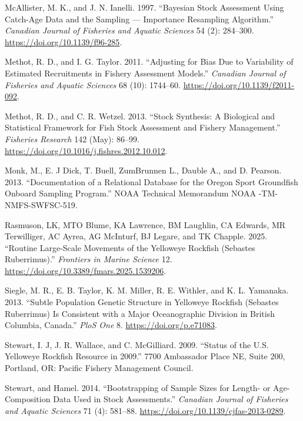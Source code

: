 \documentclass[
]{scrartcl}
\newlength{\cslhangindent}
\newenvironment{CSLReferences}[2] %
 {\begin{list}{}{%
  \setlength{\itemindent}{0pt}
  \setlength{\leftmargin}{0pt}
  \setlength{\parsep}{0pt}
  \ifodd #1
   \setlength{\leftmargin}{\cslhangindent}
   \setlength{\itemindent}{-1\cslhangindent}
  \fi
  \setlength{\itemsep}{#2\baselineskip}}}
 {\end{list}}
\begin{document}
\begin{CSLReferences}{1}{0}
McAllister, M. K., and J. N. Ianelli. 1997. {``Bayesian Stock Assessment
Using Catch-Age Data and the Sampling --- Importance Resampling
Algorithm.''} \emph{Canadian Journal of Fisheries and Aquatic Sciences}
54 (2): 284--300. \url{https://doi.org/10.1139/f96-285}.

Methot, R. D., and I. G. Taylor. 2011. {``Adjusting for Bias Due to
Variability of Estimated Recruitments in Fishery Assessment Models.''}
\emph{Canadian Journal of Fisheries and Aquatic Sciences} 68 (10):
1744--60. \url{https://doi.org/10.1139/f2011-092}.

Methot, R. D., and C. R. Wetzel. 2013. {``Stock Synthesis: A Biological
and Statistical Framework for Fish Stock Assessment and Fishery
Management.''} \emph{Fisheries Research} 142 (May): 86--99.
\url{https://doi.org/10.1016/j.fishres.2012.10.012}.

Monk, M., E. J Dick, T. Buell, ZumBrunnen L., Dauble A., and D. Pearson.
2013. {``Documentation of a Relational Database for the Oregon Sport
Groundfish Onboard Sampling Program.''} NOAA Technical Memorandum NOAA
-TM-NMFS-SWFSC-519.

Rasmuson, LK, MTO Blume, KA Lawrence, BM Laughlin, CA Edwards, MR
Terwilliger, AC Ayrea, AG McInturf, BJ Legare, and TK Chapple. 2025.
{``Routine Large-Scale Movements of the Yelloweye Rockfish (Sebastes
Ruberrimus).''} \emph{Frontiers in Marine Science} 12.
\url{https://doi.org/10.3389/fmars.2025.1539206}.

Siegle, M. R., E. B. Taylor, K. M. Miller, R. E. Withler, and K. L.
Yamanaka. 2013. {``Subtle Population Genetic Structure in Yelloweye
Rockfish (Sebastes Ruberrimus) Is Consistent with a Major Oceanographic
Division in British Columbia, Canada.''} \emph{PloS One} 8.
\url{https://doi.org/p.e71083}.

Stewart, I. J, J. R. Wallace, and C. McGilliard. 2009. {``Status of the
{U}.{S}. Yelloweye Rockfish Resource in 2009.''} 7700 Ambassador Place
NE, Suite 200, Portland, OR: Pacific Fishery Management Council.

Stewart, and Hamel. 2014. {``Bootstrapping of Sample Sizes for Length-
or Age-Composition Data Used in Stock Assessments.''} \emph{Canadian
Journal of Fisheries and Aquatic Sciences} 71 (4): 581--88.
\url{https://doi.org/10.1139/cjfas-2013-0289}.


\end{CSLReferences}
\end{document}
